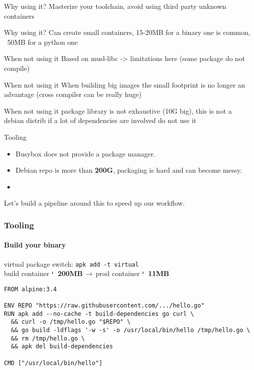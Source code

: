 \documentclass{beamer}
\begin{document}
\begin{frame}{Why using it?}
    Masterize your toolchain, avoid using third party unknown containers
\end{frame}

\begin{frame}{Why using it?}
  Can create small containers, 15-20MB for a binary one is common,
    ~50MB for a python one
\end{frame}

\begin{frame}{When not using it}
  Based on musl-libc -> limitations here (some package do not compile)
\end{frame}

\begin{frame}{When not using it}
  When building big images the small footprint is no longer an advantage
    (cross compiler can be really huge)
\end{frame}

\begin{frame}{When not using it}
  package library is not exhaustive (10G big), this is not a debian distrib
    if a lot of dependencies are involved do not use it
\end{frame}
\begin{frame}{Tooling}{}
  \begin{itemize}
    \item Busybox does not provide a package manager.
    \item Debian repo is more than \textbf{200G}, packaging is hard and can become messy.
    \item
  \end{itemize}
  Let's build a pipeline around this to speed up our workflow.
\end{frame}


\begin{frame}[fragile]
  \frametitle{Tooling}
  \framesubtitle{Build your binary}
  virtual package switch:  \texttt{apk add -t virtual} \\
  build container \textbf{\char`~200MB}$\,\to\,$prod container
  \textbf{\char`~11MB}

  \begin{verbatim}
FROM alpine:3.4

ENV REPO "https://raw.githubusercontent.com/.../hello.go"
RUN apk add --no-cache -t build-dependencies go curl \
  && curl -o /tmp/hello.go "$REPO" \
  && go build -ldflags '-w -s' -o /usr/local/bin/hello /tmp/hello.go \
  && rm /tmp/hello.go \
  && apk del build-dependencies

CMD ["/usr/local/bin/hello"]
  \end{verbatim}
\end{frame}
\end{document}
